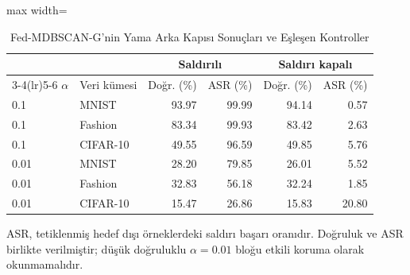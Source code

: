 \begin{table}[!t]
\centering\footnotesize
\setlength{\tabcolsep}{4pt}
\caption{Fed-MDBSCAN-G'nin Yama Arka Kapısı Sonuçları ve Eşleşen Kontroller}\label{tab:backdoor}
\begin{adjustbox}{max width=\columnwidth}
\begin{tabular}{llrrrr}
\toprule
& & \multicolumn{2}{c}{Saldırılı} & \multicolumn{2}{c}{Saldırı kapalı} \\
\cmidrule(lr){3-4}\cmidrule(lr){5-6}
$\alpha$ & Veri kümesi & Doğr. (\%) & ASR (\%) & Doğr. (\%) & ASR (\%) \\
\midrule
0.1 & MNIST & 93.97 & 99.99 & 94.14 & 0.57 \\
0.1 & Fashion & 83.34 & 99.93 & 83.42 & 2.63 \\
0.1 & CIFAR-10 & 49.55 & 96.59 & 49.85 & 5.76 \\
0.01 & MNIST & 28.20 & 79.85 & 26.01 & 5.52 \\
0.01 & Fashion & 32.83 & 56.18 & 32.24 & 1.85 \\
0.01 & CIFAR-10 & 15.47 & 26.86 & 15.83 & 20.80 \\
\bottomrule
\end{tabular}
\end{adjustbox}

\par\vspace{3pt}\parbox{\linewidth}{\footnotesize ASR, tetiklenmiş hedef dışı örneklerdeki saldırı başarı oranıdır. Doğruluk ve ASR birlikte verilmiştir; düşük doğruluklu $\alpha=0.01$ bloğu etkili koruma olarak okunmamalıdır.}
\end{table}
